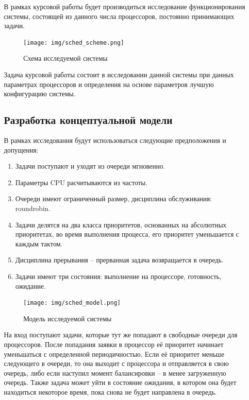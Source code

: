 В рамках курсовой работы будет производиться исследование функционирования
системы, состоящей из данного числа процессоров, постоянно принимающих задачи.
\begin{figure}[h]
\centering
\texttt{[image: img/sched\_scheme.png]}
\caption{Схема исследуемой системы}
\end{figure}

Задача курсовой работы состоит в исследовании данной системы при данных параметрах
процессоров и определения на основе параметров лучшую конфигурацию системы.

\subsection{Разработка концептуальной модели}
В рамках исследования будут использоваться следующие предположения и допущения:
\begin{enumerate}
\item Задачи поступают и уходят из очереди мгновенно.
\item Параметры CPU расчитываются из частоты.
\item Очереди имеют ограниченный размер, дисциплина обслуживания: roundrobin.
\item Задачи делятся на два класса приоритетов, основанных на абсолютных
приоритетах, во время выполнения процесса, его приоритет уменьшается с каждым
тактом.
\item Дисциплина прерывания -- прерванная задача возвращается в очередь.
\item Задачи имеют три состояния: выполнение на процессоре, готовность, ожидание.
\end{enumerate}
\begin{figure}[h]
\centering
\texttt{[image: img/sched\_model.png]}
\caption{Модель исследуемой системы}
\end{figure}

На вход поступают задачи, которые тут же попадают в свободные очереди для
процессоров. После попадания заявки в процессор её приоритет начинает уменьшаться
с определенной периодичностью. Если её приоритет меньше следующего в очереди,
то она выходит с процессора и отправляется в свою очередь, либо если наступил
момент балансировки -- в менее загруженную очередь. Также задача может уйти в
состояние ожидания, в котором она будет находиться некоторое время, пока снова
не будет направлена в очередь.


